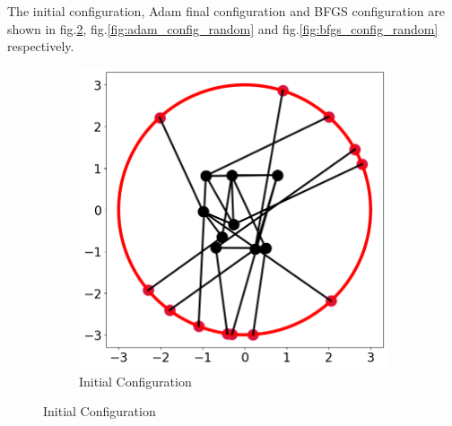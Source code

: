 \documentclass[12pt]{article}
\newcommand{\0}{\boldsymbol{0}}
\begin{document}
The initial configuration, Adam final configuration and BFGS configuration are shown in fig.\ref{fig:config_random}, fig.\ref{fig:adam_config_random} and fig.\ref{fig:bfgs_config_random} respectively.

\begin{figure}[h!]
    \centering
    \begin{subfigure}[b]{0.3\textwidth}
        \centering
        \includegraphics[width=\textwidth]{../img/problem_2/random.png}
        \caption{Initial Configuration}
        \label{fig:config_random}
        

\end{subfigure}
\end{figure}
\end{document}

